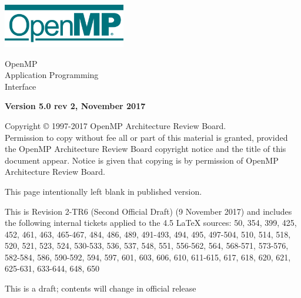
  \begin{titlepage}
    \begin{flushleft}
     \hspace{-6em} \includegraphics[width=0.4\textwidth]{openmp-logo.png}
    \end{flushleft}

    \begin{adjustwidth}{-0.75in}{0in}
    \begin{center}
      \Huge
      \textsf{OpenMP\\Application Programming\\Interface}

      \vspace{0.5in}\textsf{    }\vspace{-0.7in}
      \normalsize

      \vspace{1.0in}

      \textbf{Version 5.0 rev 2, November 2017}
    \end{center}
    \end{adjustwidth}

    \vspace{3.0in}

\begin{adjustwidth}{0pt}{1em}\setlength{\parskip}{0.25\baselineskip}%
Copyright © 1997-2017 OpenMP Architecture Review Board.\\
Permission to copy without fee all or part of this material is granted,
provided the OpenMP Architecture Review Board copyright notice and
the title of this document appear. Notice is given that copying is by
permission of OpenMP Architecture Review Board.\end{adjustwidth}

  \end{titlepage}


\clearpage
\thispagestyle{empty}
\phantom{a}
This page intentionally left blank in published version.

This is Revision 2-TR6 (Second Official Draft) (9 November 2017) and 
includes the following internal tickets applied to the 4.5 LaTeX sources: 
50, 354, 399, 425, 452, 461, 463, 465-467, 484, 486, 489, 491-493, 494, 
495, 497-504, 510, 514, 518, 520, 521, 523, 524, 530-533, 536, 537, 548, 551, 
556-562, 564, 568-571, 573-576, 582-584, 586, 590-592, 594, 597, 601, 
603, 606, 610, 611-615, 617, 618, 620, 621, 625-631, 633-644, 648, 
650

This is a draft; contents will change in official release

\vfill

